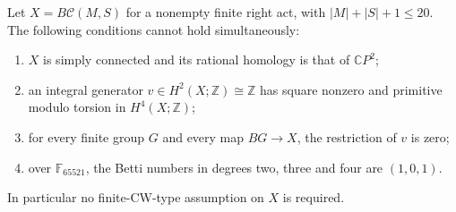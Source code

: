 \begin{theorem}
\label{C:finite-target-small-act-twenty}
Let $X=B\mathcal C(M,S)$ for a nonempty finite right act, with
$|M|+|S|+1\leq20$. The following conditions cannot hold simultaneously:
\begin{enumerate}
\item $X$ is simply connected and its rational homology is that of
$\mathbb CP^2$;
\item an integral generator $v\in H^2(X;\mathbb Z)\cong\mathbb Z$
has square nonzero and primitive modulo torsion in $H^4(X;\mathbb Z)$;
\item for every finite group $G$ and every map $BG\to X$, the
restriction of $v$ is zero;
\item over $\mathbb F_{65521}$, the Betti numbers in degrees
two, three and four are $(1,0,1)$.
\end{enumerate}
In particular no finite-CW-type assumption on $X$ is required.
\end{theorem}
